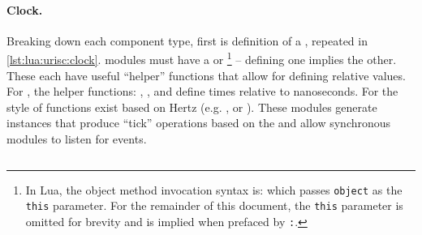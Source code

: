\paragraph{Clock.} Breaking down each component type, first is definition of a , repeated in \cref{lst:lua:urisc:clock}.  modules must have a  or \footnote{In Lua, the object method invocation syntax is:  which passes \texttt{object} as the \texttt{this} parameter. For the remainder of this document, the \texttt{this} parameter is omitted for brevity and is implied when prefaced by \texttt{:}.} -- defining one implies the other. These each have useful ``helper'' functions that allow for defining relative values. For , the helper functions: , ,  and  define times relative to nanoseconds. For  the style of functions exist based on Hertz (e.g. , or ). These  modules generate instances that produce ``tick'' operations based on the  and allow synchronous modules to listen for events. 

\begin{listing}[h!]
    \inputminted[escapeinside=||, firstline=10, lastline=13]{lua}{./listings/urisc.lua}
    \caption{ configuration for the processors main clock (cut from \cref{lst:lua:urisc-example-1}).}
    \label{lst:lua:urisc:clock}
\end{listing}

